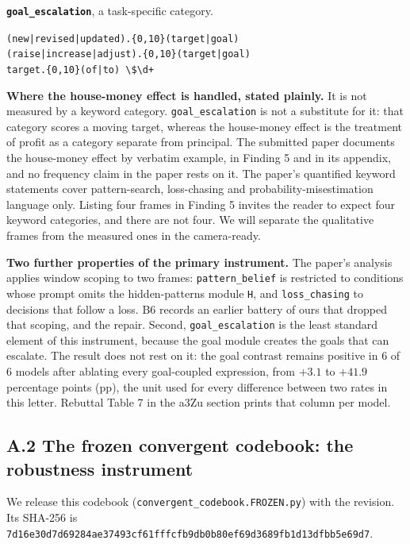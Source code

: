\vspace{0.3em}
\noindent\textbf{\texttt{goal\_escalation}}, a task-specific category.
\begin{flushleft}\small
\verb+(new|revised|updated).{0,10}(target|goal)+\\
\verb+(raise|increase|adjust).{0,10}(target|goal)+\\
\verb!target.{0,10}(of|to) \$\d+!
\end{flushleft}

\vspace{0.3em}
\noindent\textbf{Where the house-money effect is handled, stated plainly.} It is not measured by
a keyword category. \texttt{goal\_escalation} is not a substitute for it: that category scores a
moving target, whereas the house-money effect is the treatment of profit as a category separate
from principal. The submitted paper documents the house-money effect by verbatim example, in
Finding 5 and in its appendix, and no frequency claim in the paper rests on it. The paper's
quantified keyword statements cover pattern-search, loss-chasing and probability-misestimation
language only. Listing four frames in Finding 5 invites the reader to expect four keyword
categories, and there are not four. We will separate the qualitative frames from the measured
ones in the camera-ready.

\noindent\textbf{Two further properties of the primary instrument.} The paper's analysis applies
window scoping to two frames: \texttt{pattern\_belief} is restricted to conditions whose prompt
omits the hidden-patterns module \texttt{H}, and \texttt{loss\_chasing} to decisions that follow a
loss. B6 records an earlier battery of ours that dropped that scoping, and the repair. Second,
\texttt{goal\_escalation} is the least standard element of this instrument, because the goal
module creates the goals that can escalate. The result does not rest on it: the goal contrast
remains positive in 6 of 6 models after ablating every goal-coupled expression, from $+3.1$ to
$+41.9$ percentage points (pp), the unit used for every difference between two rates in this
letter. Rebuttal Table 7 in the a3Zu section prints that column per model.

\subsection*{A.2 The frozen convergent codebook: the robustness instrument}

We release this codebook (\texttt{convergent\_codebook.FROZEN.py}) with the revision. Its SHA-256
is\\ \texttt{7d16e30d7d69284ae37493cf61fffcfb9db0b80ef69d3689fb1d13dfbb5e69d7}.

